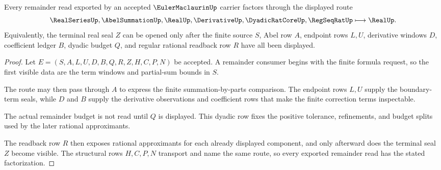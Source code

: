 \begin{theorem}
\label{thm:euler-maclaurin-remainder-handoff}
Every remainder read exported by an accepted $\EulerMaclaurinUp$ carrier factors through the displayed route
$$
\RealSeriesUp,\AbelSummationUp,\RealUp,\DerivativeUp,\DyadicRatCoreUp,\RegSeqRatUp \longmapsto \RealUp .
$$
Equivalently, the terminal real seal $Z$ can be opened only after the finite source $S$, Abel row $A$, endpoint rows $L,U$, derivative windows $D$, coefficient ledger $B$, dyadic budget $Q$, and regular rational readback row $R$ have all been displayed.
\end{theorem}
\begin{proof}
Let $E=(S,A,L,U,D,B,Q,R,Z,H,C,P,N)$ be accepted. A remainder consumer begins with the finite formula request, so the first visible data are the term windows and partial-sum bounds in $S$.

The route may then pass through $A$ to express the finite summation-by-parts comparison. The endpoint rows $L,U$ supply the boundary-term seals, while $D$ and $B$ supply the derivative observations and coefficient rows that make the finite correction terms inspectable.

The actual remainder budget is not read until $Q$ is displayed. This dyadic row fixes the positive tolerance, refinements, and budget splits used by the later rational approximants.

The readback row $R$ then exposes rational approximants for each already displayed component, and only afterward does the terminal seal $Z$ become visible. The structural rows $H,C,P,N$ transport and name the same route, so every exported remainder read has the stated factorization.
\end{proof}

